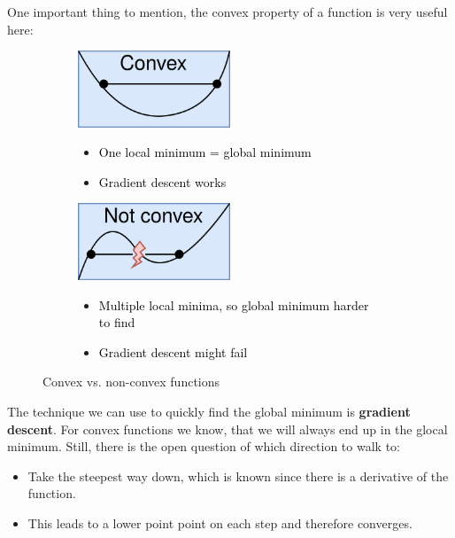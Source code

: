 One important thing to mention, the convex property of a function is very useful here:
\begin{figure}[H]
  \centering
  \begin{subfigure}{0.45\textwidth}
    \centering
    \includegraphics[width=0.5\textwidth]{assets/regression/sr__convex.png}
    \begin{itemize}
      \item \textcolor{black}{One local minimum = global minimum}
      \item \textcolor{black}{Gradient descent works}
    \end{itemize}
  \end{subfigure}\hspace*{0.05\textwidth}
  \begin{subfigure}{0.45\textwidth}
    \centering
    \includegraphics[width=0.5\textwidth]{assets/regression/sr__nonconvex.png}
    \begin{itemize}
      \item \textcolor{black}{Multiple local minima, so global minimum harder to find}
      \item \textcolor{black}{Gradient descent might fail}
    \end{itemize}
  \end{subfigure}
  \caption{Convex vs. non-convex functions}
  \label{fig:4_conv_vs_nonconv}
\end{figure}

The technique we can use to quickly find the global minimum is \textbf{gradient descent}. For convex functions we know, that we will always end up in the glocal minimum. Still, there is the open question of which direction to walk to:
\begin{itemize}
  \item Take the steepest way down, which is known since there is a derivative of the function.
  \item This leads to a lower point point on each step and therefore converges.
\end{itemize}

